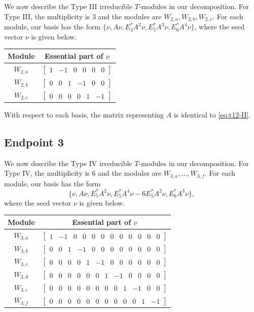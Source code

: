 \documentclass[12pt,letterpaper]{article}
\newcommand{\rowvector}[1]{\begin{bmatrix} #1 \end{bmatrix}}
\begin{document}
We now describe the Type III irreducible $T$-modules in our decomposition. For Type III, the multiplicity is 3 and the modules are $W_{2,a},W_{2,b},W_{2,c}$. For each module, our basis has the form $\{\nu, A\nu, E_4^*A^2\nu, E_5^*A^3\nu, E_6^*A^4\nu\}$, where the seed vector $\nu$ is given below.
\begin{center}
    \begin{tabular}{c | c}
    \toprule
       \textbf{Module}  & \textbf {Essential part of }$\nu$ \\
       \midrule
       $W_{2,a}$  & $\rowvector{1 & -1 & 0 & 0 & 0 & 0}$ \\[1.67pt]
       $W_{2,b}$  & $\rowvector{0 & 0 & 1 & -1 & 0 & 0}$ \\[1.67pt]
       $W_{2,c}$  & $\rowvector{0 & 0 & 0 & 0 & 1 & -1}$ \\
    \bottomrule
   \end{tabular}
\end{center}

With respect to each basis, the matrix representing $A$ is identical to \eqref{eq:t12-II}.

\subsection{Endpoint 3}

We now describe the Type IV irreducible $T$-modules in our decomposition. For Type IV, the multiplicity is 6 and the modules are $W_{3,a},\dots,W_{3,f}$. For each module, our basis has the form 
\begin{equation*}
    \{\nu, A\nu, E_5^*A^2\nu, E_5^*A^4\nu - 6E_5^*A^2\nu, E_6^*A^3\nu\},
\end{equation*} 
where the seed vector $\nu$ is given below.
\begin{center}
    \begin{tabular}{c | c}
    \toprule
       \textbf{Module}  & \textbf {Essential part of }$\nu$ \\
       \midrule
       $W_{3,a}$  & $\rowvector{1 & -1 & 0 & 0 & 0 & 0 & 0 & 0 & 0 & 0 & 0 & 0}$ \\[1.67pt]
       $W_{3,b}$  & $\rowvector{0 & 0 & 1 & -1 & 0 & 0 & 0 & 0 & 0 & 0 & 0 & 0}$ \\[1.67pt]
      $W_{3,c}$  & $\rowvector{0 & 0 & 0 & 0 & 1 & -1 & 0 & 0 & 0 & 0 & 0 & 0}$ \\[1.67pt]
       $W_{3,d}$  & $\rowvector{0 & 0 & 0 & 0 & 0 & 0 & 1 & -1 & 0 & 0 & 0 & 0}$ \\[1.67pt]
       $W_{3,e}$  & $\rowvector{0 & 0 & 0 & 0 & 0 & 0 & 0 & 0 & 1 & -1 & 0 & 0}$ \\[1.67pt]
     $W_{3,f}$  & $\rowvector{0 & 0 & 0 & 0 & 0 & 0 & 0 & 0 & 0 & 0 & 1 & -1}$ \\
    \bottomrule
    \end{tabular}
\end{center}
\end{document}
